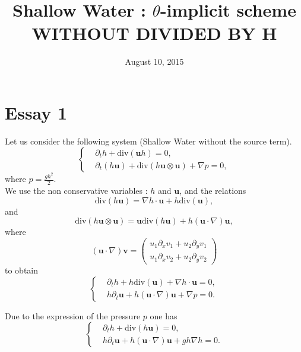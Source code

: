 \documentclass[a4paper, 11pt]{article}
\begin{document}
\title{Shallow Water : $\theta$-implicit scheme \\ WITHOUT DIVIDED BY H}
\date{August 10, 2015}
\author{}
\maketitle
\section{Essay 1}
Let us consider the following system (Shallow Water without the source term).
\begin{equation*}
\left\{
\begin{split}
&\partial_t h+\text{div}\left(\boldsymbol{u}h\right)=0,\\
&\partial_t \left(h\boldsymbol{u}\right)+\text{div}\left(h\boldsymbol{u}\otimes \boldsymbol{u}\right)+\nabla p=0,
\end{split}
\right.
\end{equation*}
where $p=\frac{gh^2}{2}.$\\
We use the non conservative variables : $h$ and $\boldsymbol{u}$, and the relations
\begin{equation*}
\text{div}\left(h\boldsymbol{u}\right)=\nabla h\cdot\boldsymbol{u}+h\text{div}\left(\boldsymbol{u}\right),
\end{equation*}
and
\begin{equation*}
\text{div}\left(h\boldsymbol{u}\otimes\boldsymbol{u}\right)=\boldsymbol{u}\text{div}\left(h\boldsymbol{u}\right)+h\left(\boldsymbol{u}\cdot\nabla\right)\boldsymbol{u},
\end{equation*}
where
\begin{equation*}
\left(\boldsymbol{u}\cdot\nabla\right)\boldsymbol{v}=\begin{pmatrix}u_1\partial_xv_1+u_2\partial_yv_1\\u_1\partial_xv_2+u_2\partial_yv_2\end{pmatrix}
\end{equation*}
to obtain 
\begin{equation*}
\left\{\begin{split}
&\partial_t h+h\text{div}(\boldsymbol{u})+\nabla h\cdot \boldsymbol{u}=0,\\
&h\partial_t \boldsymbol{u}+h\left(\boldsymbol{u}\cdot \nabla\right)\boldsymbol{u}+\nabla p=0.
\end{split}\right.
\end{equation*}

Due to the expression of the pressure $p$ one has 
\begin{equation*}
\left\{\begin{split}
&\partial_t h+\text{div}\left(h\boldsymbol{u}\right)=0,\\
&h\partial_t \boldsymbol{u}+h\left(\boldsymbol{u}\cdot \nabla\right)\boldsymbol{u}+gh\nabla h=0.
\end{split}\right.
\end{equation*}
\end{document}
